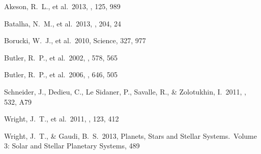 \begin{thebibliography}

 Akeson, R.~L., et al.\ 2013, 
\pasp, 125, 989 %

 Batalha, N.~M., et al.\ 2013, 
\apjs, 204, 24 %

 Borucki, W.~J., et al.\ 2010, 
Science, 327, 977 %

 Butler, R.~P., et al.\ 2002, 
\apj, 578, 565 %

 Butler, R.~P., et al.\ 2006, 
\apj, 646, 505 %

 Schneider, J., Dedieu, C., 
Le Sidaner, P., Savalle, R., \& Zolotukhin, I.\ 2011, \aap, 532, A79

 Wright, J.~T., et al.\ 2011,
  \pasp, 123, 412 %

 Wright, J.~T., \& Gaudi, B.~S.\ 2013,
  Planets, Stars and Stellar Systems.~Volume 3: Solar and Stellar
  Planetary Systems, 489 %
  
\end{thebibliography}
